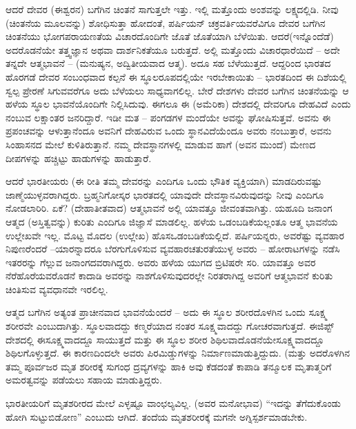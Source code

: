 \vskip 4pt

ಆದರೆ ದೇವರ (ಈಶ್ವರನ) ಬಗೆಗಿನ ಚಿಂತನೆ ಸಾಗುತ್ತಲೇ ಇತ್ತು. ಇಲ್ಲಿ ಮತ್ತೊಂದು ಅಂಶವನ್ನು ಲಕ್ಷ್ಯದಲ್ಲಿಡಿ. ನೀವು (ಚಿಂತನೆಯ ಮೂಲವನ್ನು) ಶೋಧಿಸುತ್ತಾ ಹೋದಂತೆ, ಪರ್ಷಿಯನ್ ಚಕ್ರವರ್ತಿಯವರೆವಿಗೂ ದೇವರ ಬಗೆಗಿನ ಚಿಂತನೆಯು ಭೋಗ\break ಪರಾಯಣತೆಯ ವಿಚಾರದೊಂದಿಗೇ ಜೊತೆ ಜೊತೆಯಾಗಿ ಬೆಳೆಯಿತು. ಆದರೆ\break (ಇನ್ನೊಂದೆಡೆ) ಅದರೊಡನೆಯೇ ತತ್ತ್ವಜ್ಞಾನ ಅಥವಾ ದಾರ್ಶನಿಕತೆಯೂ ಬರುತ್ತದೆ. ಅಲ್ಲಿ ಮತ್ತೊಂದು ವಿಚಾರಧಾರೆಯಿದೆ – ಅದೇ ತನ್ನದೇ ಆತ್ಮಭಾವನೆ – (ಮನುಷ್ಯನ, ಅದ್ವಿತೀಯವಾದ ಆತ್ಮ). ಅದೂ ಸಹ ಬೆಳೆಯುತ್ತದೆ. ಆದ್ದರಿಂದ ಭಾರತದ ಹೊರಗಡೆ ದೇವರ ಸಂಬಂಧವಾದ ಕಲ್ಪನೆ ಈ ಸ್ಥೂಲರೂಪದಲ್ಲಿಯೇ ಇರಬೇಕಾಯಿತು – ಭಾರತದಿಂದ ಈ ದಿಶೆಯಲ್ಲಿ ಸ್ವಲ್ಪ ಪ್ರೇರಣೆ ಸಿಗುವವರೆಗೂ ಅದು ಬೆಳೆಯಲು ಸಾಧ್ಯವಾಗಲಿಲ್ಲ. ಬೇರೆ ದೇಶಗಳು ದೇವರ ಬಗೆಗಿನ ಚಿಂತನೆಯನ್ನು ಆ ಹಳೆಯ ಸ್ಥೂಲ ಭಾವನೆಯೊಂದಿಗೇ ನಿಲ್ಲಿಸಿದುವು. ಈಗಲೂ ಈ (ಅಮೆರಿಕಾ) ದೇಶದಲ್ಲಿ ದೇವರಿಗೂ ದೇಹವಿದೆ ಎಂದು ನಂಬುವ ಲಕ್ಷಾಂತರ ಜನರಿದ್ದಾರೆ. ಇಡೀ ಮತ – ಪಂಗಡಗಳ ಮಂದೆಯೇ ಅವನ್ನು ಘೋಷಿಸುತ್ತವೆ. ಅವನು ಈ ಪ್ರಪಂಚವನ್ನು ಆಳುತ್ತಾನೆಂದೂ ಅವನಿಗೆ ದೇಹವಿರುವ ಒಂದು ಸ್ಥಾನವಿದೆಯೆಂದೂ ಅವರು ನಂಬುತ್ತಾರೆ, ಅವನು ಸಿಂಹಾಸನದ ಮೇಲೆ ಕುಳಿತಿರುತ್ತಾನೆ. ನಮ್ಮ ದೇವಸ್ಥಾನಗಳಲ್ಲಿ ಮಾಡುವ ಹಾಗೆ (ಅವನ ಮುಂದೆ) ಮೇಣದ ದೀಪಗಳನ್ನು ಹಚ್ಚಿಟ್ಟು ಹಾಡುಗಳನ್ನು ಹಾಡುತ್ತಾರೆ.

\vskip 4pt

ಆದರೆ ಭಾರತೀಯರು (ಈ ರೀತಿ ತಮ್ಮ ದೇವರನ್ನು ಎಂದಿಗೂ ಒಂದು ಭೌತಿಕ ವ್ಯಕ್ತಿಯಾಗಿ) ಮಾಡದಿರುವಷ್ಟು ಜಾಣ್ಮೆಯುಳ್ಳವರಾಗಿದ್ದರು. ಬ್ರಹ್ಮನಿಗೋಸ್ಕರ ಭಾರತದಲ್ಲಿ ಯಾವುದೇ ದೇವಸ್ಥಾನವಿರುವುದನ್ನು ನೀವು ಎಂದಿಗೂ ನೋಡಲಾರಿರಿ. ಏಕೆ? (ದೇಹಾತೀತವಾದ) ಆತ್ಮಭಾವನೆ ಅಲ್ಲಿ ಯಾವತ್ತೂ ಜೀವಂತವಾಗಿತ್ತು. ಯಹೂದಿ ಜನಾಂಗ ಆತ್ಮದ (ಅಸ್ತಿತ್ವವನ್ನು) ಕುರಿತು ಎಂದಿಗೂ ಜಿಜ್ಞಾಸೆ ಮಾಡಲಿಲ್ಲ. ಹಳೆಯ ಒಡಂಬಡಿಕೆಯಲ್ಲಂತೂ ಆತ್ಮ ಭಾವನೆಯ ಉಲ್ಲೇಖವೇ ಇಲ್ಲ. ಮೊಟ್ಟ ಮೊದಲ (ಉಲ್ಲೇಖ) ಹೊಸ\break ಒಡಂಬಡಿಕೆಯಲ್ಲಿದೆ. ಪರ್ಷಿಯನ್ನರು, ಅವರೆಷ್ಟು ವ್ಯವಹಾರ ನಿಪುಣರೆಂದರೆ –\break ಯಾರನ್ನಾದರೂ ಬೆರಗುಗೊಳಿಸುವ ವ್ಯವಹಾರಚತುರತೆಯುಳ್ಳ ಅವರು – ಹೋರಾಟಗಳನ್ನು ನಡೆಸಿ ಇತರರನ್ನು ಗೆಲ್ಲುವ ಜನಾಂಗದವರಾಗಿದ್ದರು. ಅವರು ಹಳೆಯ ಯುಗದ ಬ್ರಿಟಿಷರೇ ಸರಿ. ಯಾವತ್ತೂ ಅವರ ನೆರೆಹೊರೆಯವರೊಡನೆ ಕಾದಾಡಿ ಅವರನ್ನು ನಾಶಗೊಳಿಸುವುದರಲ್ಲೇ ನಿರತರಾಗಿದ್ದ ಅವರಿಗೆ ಆತ್ಮಭಾವನೆ ಕುರಿತು ಚಿಂತಿಸುವ ವ್ಯವಧಾನವೇ ಇರಲಿಲ್ಲ.

\vskip 4pt

ಆತ್ಮದ ಬಗೆಗಿನ ಅತ್ಯಂತ ಪ್ರಾಚೀನವಾದ ಭಾವನೆಯೆಂದರೆ – ಅದು ಈ ಸ್ಥೂಲ ಶರೀರದೊಳಗಿನ ಒಂದು ಸೂಕ್ಷ್ಮ ಶರೀರವೇ ಎಂಬುದಾಗಿತ್ತು. ಸ್ಥೂಲವಾದದ್ದು ಕಣ್ಮರೆಯಾದ ನಂತರ ಸೂಕ್ಷ್ಮವಾದದ್ದು ಗೋಚರವಾಗುತ್ತದೆ. ಈಜಿಪ್ಟ್ ದೇಶದಲ್ಲಿ ಈ\break ಸೂಕ್ಷ್ಮವಾದದ್ದೂ ಸಾಯುತ್ತದೆ ಮತ್ತು ಈ ಸ್ಥೂಲ ಶರೀರ ಶಿಥಿಲವಾದೊಡನೆಯೇ\break ಸೂಕ್ಷ್ಮವಾದದ್ದೂ ಶಿಥಿಲಗೊಳ್ಳುತ್ತದೆ. ಈ ಕಾರಣದಿಂದಲೇ ಅವರು ಪಿರಮಿಡ್ಡುಗಳನ್ನು ನಿರ್ಮಾಣಮಾಡುತ್ತಿದ್ದುದು. (ಮತ್ತು ಅದರೊಳಗಿನ ತಮ್ಮ ಪೂರ್ವಜರ ಮೃತ ಶರೀರಕ್ಕೆ ಸುಗಂಧ ದ್ರವ್ಯಗಳನ್ನು ಹಾಕಿ ಅವು ಕೆಡದಂತೆ ಕಾಪಾಡಿ ತನ್ಮೂಲಕ ಮೃತಾತ್ಮರಿಗೆ ಅಮರತ್ವವನ್ನು ಪಡೆಯಲು ಸಹಾಯ ಮಾಡುತ್ತಿದ್ದರು.

\vskip 4pt

ಭಾರತೀಯರಿಗೆ ಮೃತಶರೀರದ ಮೇಲೆ ಎಳ್ಳಷ್ಟೂ ವಾಂಛಲ್ಯವಿಲ್ಲ. (ಅವರ ಮನೋಭಾವ) “ಇದನ್ನು ತೆಗೆದುಕೊಂಡು ಹೋಗಿ ಸುಟ್ಟುಬಿಡೋಣ'' ಎಂಬುದು ಆಗಿದೆ. ತಂದೆಯ ಮೃತಶರೀರಕ್ಕೆ ಮಗನೇ ಅಗ್ನಿಸ್ಪರ್ಶಮಾಡಬೇಕು.


